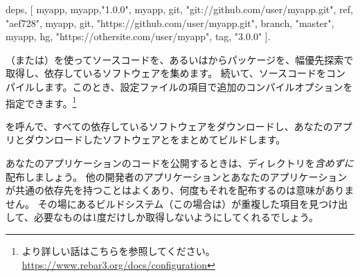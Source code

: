 \begin{VerbatimText}
{deps, [
  myapp,
  {myapp,"1.0.0"},
  {myapp, {git, "git://github.com/user/myapp.git", {ref, "aef728"}}},
  {myapp, {git, "https://github.com/user/myapp.git", {branch, "master"}}},
  {myapp, {hg, "https://othersite.com/user/myapp", {tag, "3.0.0"}}}
 ]}.
\end{VerbatimText}

（または）を使ってソースコードを、あるいは\href{https://hex.pm}{}からパッケージを、幅優先探索で取得し、依存しているソフトウェアを集めます。
続いて、ソースコードをコンパイルします。このとき、設定ファイルの項目で追加のコンパイルオプションを指定できます。\footnote{より詳しい話はこちらを参照してください。\href{https://www.rebar3.org/docs/configuration}{https://www.rebar3.org/docs/configuration}}

を呼んで、すべての依存しているソフトウェアをダウンロードし、あなたのアプリとダウンロードしたソフトウェアとをまとめてビルドします。

あなたのアプリケーションのコードを公開するときは、ディレクトリを\emph{含めずに}配布しましょう。
他の開発者のアプリケーションとあなたのアプリケーションが共通の依存先を持つことはよくあり、何度もそれを配布するのは意味がありません。
その場にあるビルドシステム（この場合は）が重複した項目を見つけ出して、必要なものは1度だけしか取得しないようにしてくれるでしょう。

